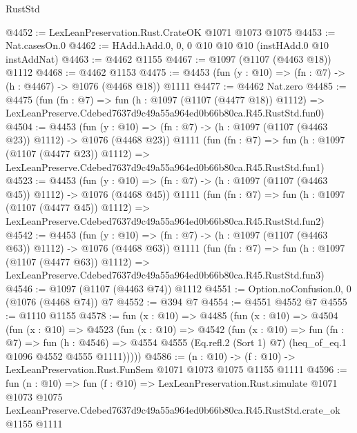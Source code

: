 \begin{lexlean}{RustStd}
\begin{coremodule}
@4452 := LexLeanPreservation.Rust.CrateOK @1071 @1073 @1075
@4453 := Nat.casesOn.{0}
@4462 := HAdd.hAdd.{0, 0, 0} @10 @10 @10 (instHAdd.{0} @10 instAddNat)
@4463 := @4462 @1155
@4467 := @1097 (@1107 (@4463 @18)) @1112
@4468 := @4462 @1153
@4475 := @4453 (fun (y : @10) => (fn : @7) -> (h : @4467) -> @1076 (@4468 @18)) @1111
@4477 := @4462 Nat.zero
@4485 := @4475
    (fun (fn : @7) =>
    fun (h : @1097 (@1107 (@4477 @18)) @1112) =>
    LexLeanPreserve.Cdebed7637d9c49a55a964ed0b66b80ca.R45.RustStd.fun0)
@4504 := @4453
    (fun (y : @10) => (fn : @7) -> (h : @1097 (@1107 (@4463 @23)) @1112) -> @1076 (@4468 @23))
    @1111
    (fun (fn : @7) =>
    fun (h : @1097 (@1107 (@4477 @23)) @1112) =>
    LexLeanPreserve.Cdebed7637d9c49a55a964ed0b66b80ca.R45.RustStd.fun1)
@4523 := @4453
    (fun (y : @10) => (fn : @7) -> (h : @1097 (@1107 (@4463 @45)) @1112) -> @1076 (@4468 @45))
    @1111
    (fun (fn : @7) =>
    fun (h : @1097 (@1107 (@4477 @45)) @1112) =>
    LexLeanPreserve.Cdebed7637d9c49a55a964ed0b66b80ca.R45.RustStd.fun2)
@4542 := @4453
    (fun (y : @10) => (fn : @7) -> (h : @1097 (@1107 (@4463 @63)) @1112) -> @1076 (@4468 @63))
    @1111
    (fun (fn : @7) =>
    fun (h : @1097 (@1107 (@4477 @63)) @1112) =>
    LexLeanPreserve.Cdebed7637d9c49a55a964ed0b66b80ca.R45.RustStd.fun3)
@4546 := @1097 (@1107 (@4463 @74)) @1112
@4551 := Option.noConfusion.{0, 0} (@1076 (@4468 @74)) @7
@4552 := @394 @7
@4554 := @4551 @4552 @7
@4555 := @1110 @1155
@4578 := fun (x : @10) =>
  @4485
    (fun (x : @10) =>
    @4504
      (fun (x : @10) =>
      @4523
        (fun (x : @10) =>
        @4542
          (fun (x : @10) =>
          fun (fn : @7) =>
          fun (h : @4546) =>
          @4554 @4555 (Eq.refl.{2} (Sort 1) @7) (heq_of_eq.{1} @1096 @4552 @4555 @1111)))))
@4586 := (n : @10) -> (f : @10) -> LexLeanPreservation.Rust.FunSem @1071 @1073 @1075 @1155 @1111
@4596 := fun (n : @10) =>
  fun (f : @10) =>
  LexLeanPreservation.Rust.simulate
    @1071
    @1073
    @1075
    LexLeanPreserve.Cdebed7637d9c49a55a964ed0b66b80ca.R45.RustStd.crate_ok
    @1155
    @1111
\end{coremodule}
\end{lexlean}
